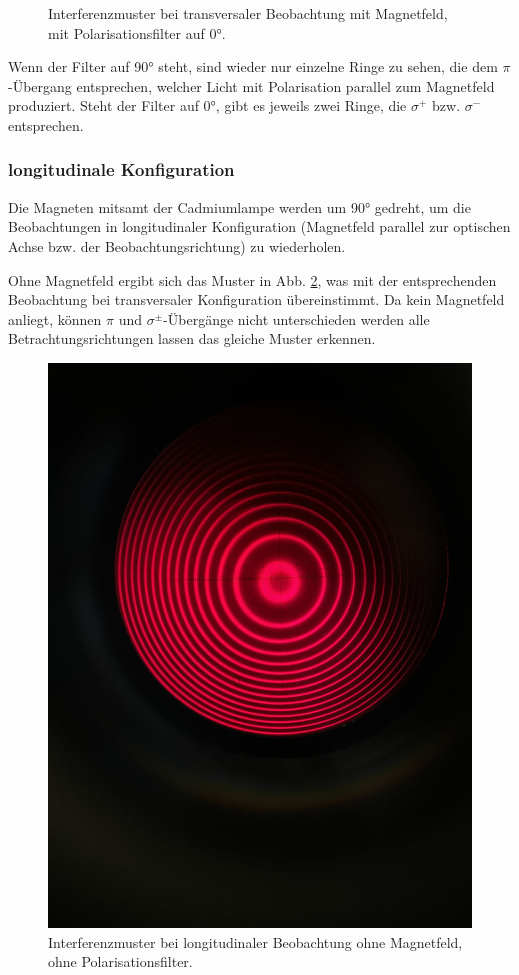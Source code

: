 \documentclass{article}
\begin{document}
\begin{multicols}{2}
\begin{figure}[H]
  \caption{Interferenzmuster bei transversaler Beobachtung mit Magnetfeld, mit Polarisationsfilter auf \ang{0}.}
  \label{fig:zeeman-transveral-mit-0}
\end{figure}
Wenn der Filter auf \ang{90} steht, sind wieder nur einzelne Ringe zu sehen, die dem $\pi$-Übergang entsprechen,
welcher Licht mit Polarisation parallel zum Magnetfeld produziert.
Steht der Filter auf \ang{0}, gibt es jeweils zwei Ringe, die $\sigma^+$ bzw. $\sigma^-$ entsprechen.


\subsubsection{longitudinale Konfiguration}
Die Magneten mitsamt der Cadmiumlampe werden um \ang{90} gedreht,
um die Beobachtungen in longitudinaler Konfiguration (Magnetfeld parallel zur optischen Achse bzw. der Beobachtungsrichtung)
zu wiederholen.

Ohne Magnetfeld ergibt sich das Muster in Abb. \ref{fig:zeeman-longitudinal-ohne-ohne}, was mit der entsprechenden Beobachtung
bei transversaler Konfiguration übereinstimmt. Da kein Magnetfeld anliegt, können $\pi$ und $\sigma^\pm$-Übergänge nicht unterschieden
werden alle Betrachtungsrichtungen lassen das gleiche Muster erkennen.
\begin{figure}[H]
  \centering
  \includegraphics[width=.8\linewidth]{zeeman-longitudinal-ohne-ohne}
  \caption{Interferenzmuster bei longitudinaler Beobachtung ohne Magnetfeld, ohne Polarisationsfilter.}
  \label{fig:zeeman-longitudinal-ohne-ohne}
\end{figure}


\end{multicols}
\end{document}
